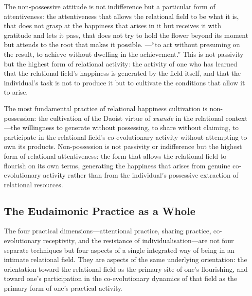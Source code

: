 The non-possessive attitude is not indifference but a particular form of attentiveness: the attentiveness that allows the relational field to be what it is, that does not grasp at the happiness that arises in it but receives it with gratitude and lets it pass, that does not try to hold the flower beyond its moment but attends to the root that makes it possible. ---``to act without presuming on the result, to achieve without dwelling in the achievement.'' This is not passivity but the highest form of relational activity: the activity of one who has learned that the relational field's happiness is generated by the field itself, and that the individual's task is not to produce it but to cultivate the conditions that allow it to arise.

\begin{claim}
The most fundamental practice of relational happiness cultivation is non-possession: the cultivation of the Daoist virtue of \emph{xuande} in the relational context---the willingness to generate without possessing, to share without claiming, to participate in the relational field's co-evolutionary activity without attempting to own its products. Non-possession is not passivity or indifference but the highest form of relational attentiveness: the form that allows the relational field to flourish on its own terms, generating the happiness that arises from genuine co-evolutionary activity rather than from the individual's possessive extraction of relational resources.
\end{claim}

\subsection{The Eudaimonic Practice as a Whole}
\label{p14:subsec:whole}

\noindent
The four practical dimensions---attentional practice, sharing practice, co-evolutionary receptivity, and the resistance of individualisation---are not four separate techniques but four aspects of a single integrated way of being in an intimate relational field. They are aspects of the same underlying orientation: the orientation toward the relational field as the primary site of one's flourishing, and toward one's participation in the co-evolutionary dynamics of that field as the primary form of one's practical activity.

